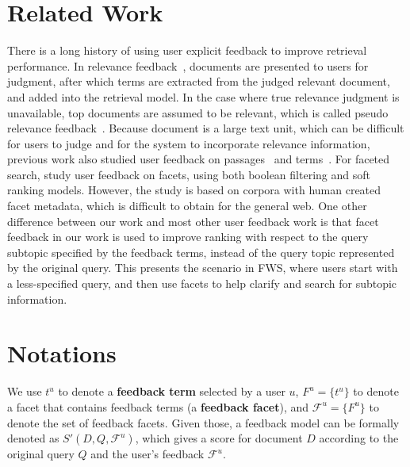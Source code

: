 \section{Related Work}
There is a long history of using user explicit feedback to improve retrieval performance. In relevance feedback~\cite{rocchio71relevance,salton1997improving}, documents are presented to users for judgment, after which terms are extracted from the judged relevant document, and added into the retrieval model. In the case where true relevance judgment is unavailable, top documents are assumed to be relevant, which is called pseudo relevance feedback~\cite{buckley1995automatic,abdul2004umass}. Because document is a large text unit, which can be difficult for users to judge and for the system to incorporate relevance information, previous work also studied user feedback on passages~\cite{allan1995relevance,xu1996query} and terms~\cite{koenemann1996case,tan2007term}. For faceted search, \citet{zhang2010interactive} study user feedback on facets, using both boolean filtering and soft ranking models. However, the study is based on corpora with human created facet metadata, which is difficult to 
obtain for the  general web.  One other difference between our work and most other user feedback work is that facet feedback in our work is used to improve ranking with respect to the query subtopic specified by the feedback terms, instead of the query topic represented by the original query. This presents the scenario in FWS, where users start with a less-specified query, and then use facets to help clarify and search for subtopic information.

\section{Notations} \label{sec:fdbk-notations}
We use $t^u$ to denote a \textbf{feedback term} selected by a user $u$, $F^u=\{t^u\}$ to denote a facet that contains feedback terms (a \textbf{feedback facet}), and $\mathcal{F}^u=\{F^u\}$ to denote the set of feedback facets. Given those, a feedback model can be formally denoted as $S'(D,Q,\mathcal{F}^u)$, which gives a score for document $D$ according to the original query $Q$ and the user's feedback $\mathcal{F}^u$. 

